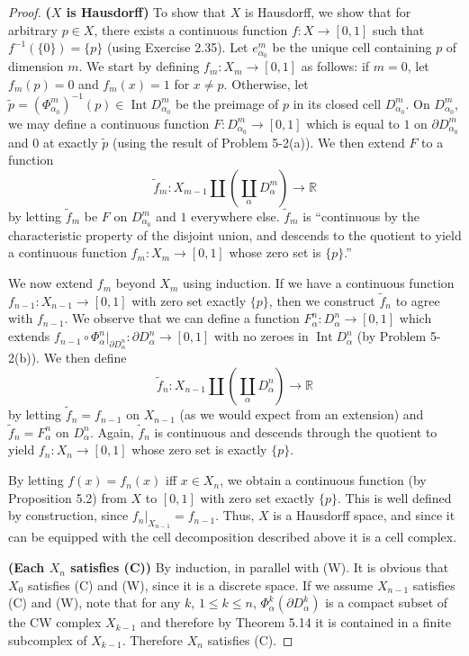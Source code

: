 \documentclass{article}
\theoremstyle{definition}
\newcommand{\R}{\mathbb{R}}
\newcommand{\p}[1]{\left(#1\right)}
\begin{document}
\begin{proof}
\textbf{($X$ is Hausdorff)}
To show that $X$ is Hausdorff, we show that for arbitrary $p \in X$, 
there exists a continuous function $f : X \to [0,1]$
such that $f^{-1}(\{0\}) = \{p\}$ (using Exercise 2.35). Let $e_{\alpha_0}^m$ be the unique
cell containing $p$ of dimension $m$. We start by defining $f_m : X_m \to [0,1]$
as follows: if $m=0$, let $f_m(p)=0$ and $f_m(x)=1$ for $x\neq p$. Otherwise, let
$\tilde{p} = (\Phi_{\alpha_0}^m)^{-1}(p) \in \operatorname{Int} D_{\alpha_0}^m$ be
the preimage of $p$ in its closed cell $D_{\alpha_0}^m$. On $D_{\alpha_0}^m$, we
may define a continuous function $F : D_{\alpha_0}^m \to [0,1]$ which is equal to 
$1$ on $\partial D_{\alpha_0}^m$ and $0$ at exactly $\tilde{p}$ (using the result of
Problem 5-2(a)). We then extend $F$ to a function
\[
\tilde{f}_m : X_{m-1} \amalg \p{\coprod_{\alpha} D_\alpha^m} \to \R
\]
by letting $\tilde{f}_m$ be $F$ on $D_{\alpha_0}^m$ and $1$ everywhere else. $\tilde{f}_m$
is ``continuous by the characteristic property of the disjoint union, and descends to the
quotient to yield a continuous function $f_m : X_m \to [0,1]$ whose zero set is $\{p\}$.''

We now extend $f_m$ beyond $X_m$ using induction. If we have a continuous function
$f_{n-1} : X_{n-1} \to [0,1]$ with zero set exactly $\{p\}$, then we construct
$\tilde{f}_n$ to agree with $f_{n-1}$. We observe that we can define a function 
$F_\alpha^n : D_\alpha^n \to [0,1]$ which extends 
$f_{n-1} \circ \Phi_\alpha^n|_{\partial D_\alpha^n} : \partial D_\alpha^n \to [0,1]$
with no zeroes in $\operatorname{Int} D_\alpha^n$ (by Problem 5-2(b)).
We then define 
\[
\tilde{f}_n : X_{n-1} \amalg \p{\coprod_\alpha D_\alpha^n} \to \R
\]
by letting $\tilde{f}_n = f_{n-1}$ on $X_{n-1}$ (as we would expect from an extension)
and $\tilde{f}_n = F^n_\alpha$ on $D_\alpha^n$. Again, $\tilde{f}_n$ is continuous and
descends through the quotient to yield $f_n : X_n \to [0,1]$ whose zero set is exactly
$\{p\}$.

By letting $f(x) = f_n(x)$ iff $x \in X_n$, we obtain a continuous function 
(by Proposition 5.2) from $X$ to $[0,1]$ with zero set exactly $\{p\}$. This
is well defined by construction, since $f_n|_{X_{n-1}} = f_{n-1}$. Thus,
$X$ is a Hausdorff space, and since it can be equipped with the cell decomposition
described above it is a cell complex.

\textbf{(Each $X_n$ satisfies (C))}
By induction, in parallel with (W). 
It is obvious that $X_0$ satisfies (C) and (W), since it is a discrete space.
If we assume $X_{n-1}$ satisfies (C) and (W), note that for any $k$, 
$1 \le k \le n$, $\Phi_\alpha^k (\partial D_\alpha^k)$ is a compact subset of the 
CW complex $X_{k-1}$ and therefore by Theorem 5.14 it is contained in a finite 
subcomplex of $X_{k-1}$. Therefore $X_n$ satisfies (C).



\end{proof}
\end{document}
